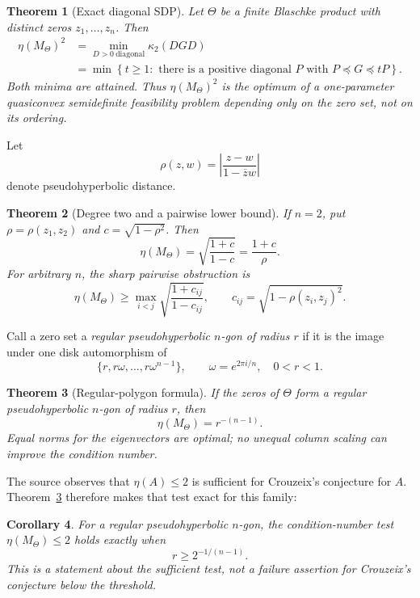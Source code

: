 \documentclass[11pt]{article}
\newtheorem{theorem}{Theorem}
\newtheorem{corollary}[theorem]{Corollary}
\newcommand{\cond}{\kappa_2}
\begin{document}
\begin{theorem}[Exact diagonal SDP]\label{thm:sdp}
Let $\Theta$ be a finite Blaschke product with distinct zeros
$z_1,\dots,z_n$.  Then
\begin{align}
 \eta(M_\Theta)^2
 &=\min_{D>0\ \mathrm{diagonal}}\cond(DGD) \label{eq:scale}\\
 &=\min\left\{t\geq1:\text{ there is a positive diagonal $P$ with }
 P\preceq G\preceq tP\right\}. \label{eq:sdp}
\end{align}
Both minima are attained.  Thus $\eta(M_\Theta)^2$ is the optimum of a
one-parameter quasiconvex semidefinite feasibility problem depending only on
the zero set, not on its ordering.
\end{theorem}

Let
\[
 \rho(z,w)=\left|\frac{z-w}{1-\overline zw}\right|
\]
denote pseudohyperbolic distance.

\begin{theorem}[Degree two and a pairwise lower bound]\label{thm:two}
If $n=2$, put $\rho=\rho(z_1,z_2)$ and
$c=\sqrt{1-\rho^2}$.  Then
\begin{equation}\label{eq:two}
 \eta(M_\Theta)=\sqrt{\frac{1+c}{1-c}}=\frac{1+c}{\rho}.
\end{equation}
For arbitrary $n$, the sharp pairwise obstruction is
\begin{equation}\label{eq:pair-bound}
 \eta(M_\Theta)\geq
 \max_{i<j}\sqrt{\frac{1+c_{ij}}{1-c_{ij}}},
 \qquad c_{ij}=\sqrt{1-\rho(z_i,z_j)^2}.
\end{equation}
\end{theorem}

Call a zero set a \emph{regular pseudohyperbolic $n$-gon of radius $r$} if it
is the image under one disk automorphism of
\[
 \{r,r\omega,\dots,r\omega^{n-1}\},\qquad
 \omega=e^{2\pi i/n},\quad 0<r<1.
\]

\begin{theorem}[Regular-polygon formula]\label{thm:regular}
If the zeros of $\Theta$ form a regular pseudohyperbolic $n$-gon of radius
$r$, then
\begin{equation}\label{eq:regular}
 \boxed{\eta(M_\Theta)=r^{-(n-1)}.}
\end{equation}
Equal norms for the eigenvectors are optimal; no unequal column scaling can
improve the condition number.
\end{theorem}

The source observes that $\eta(A)\leq2$ is sufficient for Crouzeix's
conjecture for $A$.  Theorem~\ref{thm:regular} therefore makes that test exact
for this family:
\begin{corollary}\label{cor:threshold}
For a regular pseudohyperbolic $n$-gon, the condition-number test
$\eta(M_\Theta)\leq2$ holds exactly when
\[
 r\geq 2^{-1/(n-1)}.
\]
This is a statement about the sufficient test, not a failure assertion for
Crouzeix's conjecture below the threshold.
\end{corollary}
\end{document}

